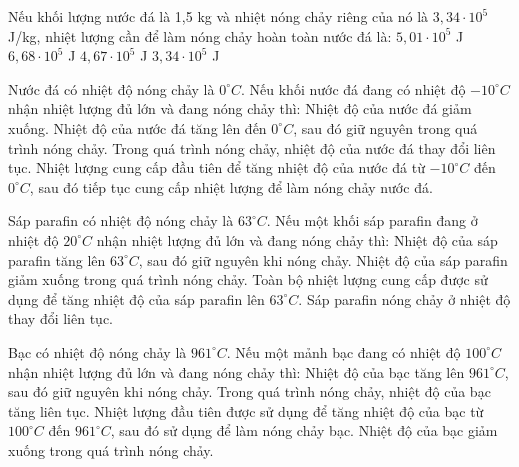\begin{ex}
Nếu khối lượng nước đá là 1,5 kg và nhiệt nóng chảy riêng của nó là $3,34 \cdot 10^5$ J/kg, nhiệt lượng cần để làm nóng chảy hoàn toàn nước đá là:
\choice
{\True $5,01 \cdot 10^5$ J}
{$6,68 \cdot 10^5$ J}
{$4,67 \cdot 10^5$ J}
{$3,34 \cdot 10^5$ J}
\end{ex}

\begin{ex}
Nước đá có nhiệt độ nóng chảy là $0^\circ C$. Nếu khối nước đá đang có nhiệt độ $-10^\circ C$ nhận nhiệt lượng đủ lớn và đang nóng chảy thì:
\choiceTF
{Nhiệt độ của nước đá giảm xuống.}
{\True Nhiệt độ của nước đá tăng lên đến $0^\circ C$, sau đó giữ nguyên trong quá trình nóng chảy.}
{Trong quá trình nóng chảy, nhiệt độ của nước đá thay đổi liên tục.}
{\True Nhiệt lượng cung cấp đầu tiên để tăng nhiệt độ của nước đá từ $-10^\circ C$ đến $0^\circ C$, sau đó tiếp tục cung cấp nhiệt lượng để làm nóng chảy nước đá.}
\end{ex}

\begin{ex}
Sáp parafin có nhiệt độ nóng chảy là $63^\circ C$. Nếu một khối sáp parafin đang ở nhiệt độ $20^\circ C$ nhận nhiệt lượng đủ lớn và đang nóng chảy thì:
\choiceTF
{\True Nhiệt độ của sáp parafin tăng lên $63^\circ C$, sau đó giữ nguyên khi nóng chảy.}
{Nhiệt độ của sáp parafin giảm xuống trong quá trình nóng chảy.}
{Toàn bộ nhiệt lượng cung cấp được sử dụng để tăng nhiệt độ của sáp parafin lên $63^\circ C$.}
{Sáp parafin nóng chảy ở nhiệt độ thay đổi liên tục.}
\end{ex}

\begin{ex}
Bạc có nhiệt độ nóng chảy là $961^\circ C$. Nếu một mảnh bạc đang có nhiệt độ $100^\circ C$ nhận nhiệt lượng đủ lớn và đang nóng chảy thì:
\choiceTF
{\True Nhiệt độ của bạc tăng lên $961^\circ C$, sau đó giữ nguyên khi nóng chảy.}
{Trong quá trình nóng chảy, nhiệt độ của bạc tăng liên tục.}
{\True Nhiệt lượng đầu tiên được sử dụng để tăng nhiệt độ của bạc từ $100^\circ C$ đến $961^\circ C$, sau đó sử dụng để làm nóng chảy bạc.}
{Nhiệt độ của bạc giảm xuống trong quá trình nóng chảy.}
\end{ex}

